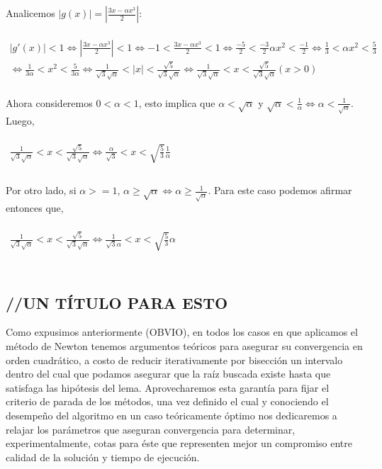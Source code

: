   Analicemos $|g(x)| = |\frac{3x - \alpha x^3}{2}|$:\\\\
  $\begin{array}{l}
	 |g'(x)| < 1 \Leftrightarrow |\frac{3x - \alpha x^3}{2}| < 1 \Leftrightarrow -1 < \frac{3x - \alpha x^3}{2} < 1
	 \Leftrightarrow \frac{-5}{2} < \frac{-3}{2}\alpha x^2 < \frac{-1}{2} \Leftrightarrow
	 \frac{1}{3} < \alpha x^2 < \frac{5}{3} \\
	 \Leftrightarrow \frac{1}{3\alpha} < x^2 < \frac{5}{3\alpha} \Leftrightarrow
	 \frac{1}{\sqrt{3}\sqrt{\alpha}} < |x| < \frac{\sqrt{5}}{\sqrt{3}\sqrt{\alpha}} \Leftrightarrow \frac{1}{\sqrt{3}\sqrt{\alpha}} < x < \frac{\sqrt{5}}{\sqrt{3}\sqrt{\alpha}} (x > 0)
  \end{array}$\\\\
  Ahora consideremos $0 < \alpha < 1$, esto implica que $\alpha < \sqrt{\alpha}$ y $\sqrt{\alpha} < \frac{1}{\alpha} \Leftrightarrow \alpha < \frac{1}{\sqrt{\alpha}}$.\\
  Luego, \\\\
	  $\begin{array}{l}
	      \frac{1}{\sqrt{3}\sqrt{\alpha}} < x < \frac{\sqrt{5}}{\sqrt{3}\sqrt{\alpha}} \Leftrightarrow \frac{\alpha}{\sqrt{3}} < x < \sqrt{\frac{5}{3}}\frac{1}{\alpha} \\
	  \end{array}$ \\\\
  Por otro lado, si $\alpha >= 1$, $\alpha \geq \sqrt{\alpha} \Leftrightarrow \alpha \geq \frac{1}{\sqrt{\alpha}}$. Para este caso podemos afirmar entonces que, \\\\
	  $\begin{array}{l}
	      \frac{1}{\sqrt{3}\sqrt{\alpha}} < x < \frac{\sqrt{5}}{\sqrt{3}\sqrt{\alpha}} \Leftrightarrow \frac{1}{\sqrt{3}\alpha} < x < \sqrt{\frac{5}{3}}\alpha \\
	  \end{array}$ \\\\

\subsection{//UN TÍTULO PARA ESTO}
	
Como expusimos anteriormente (OBVIO), en todos los casos en que aplicamos el método de Newton tenemos argumentos teóricos para asegurar su convergencia en orden cuadrático, a costo de reducir iterativamente por bisección un intervalo dentro del cual que podamos asegurar que la raíz buscada existe hasta que satisfaga las hipótesis del lema. Aprovecharemos esta garantía para fijar el criterio de parada de los métodos, una vez definido el cual y conociendo el desempeño del algoritmo en un caso teóricamente óptimo nos dedicaremos a relajar los parámetros que aseguran convergencia para determinar, experimentalmente, cotas para éste que representen mejor un compromiso entre calidad de la solución y tiempo de ejecución.

